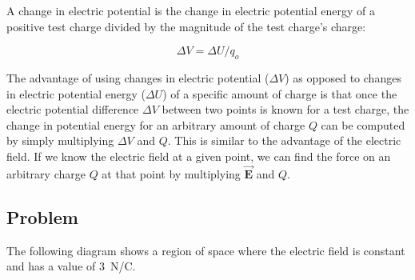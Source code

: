 \documentclass{article}
\newcommand{\bfvec}[1]{\vec{\mathbf{#1}}}
\begin{document}
A change in electric potential is the change in electric potential energy of a positive test charge divided by the magnitude of the test charge's charge:

\begin{equation}
\Delta V = {\Delta U}/{q_o}
\end{equation}

The advantage of using changes in electric potential ($\Delta V$) as opposed to changes in electric potential energy ($\Delta U$) of a specific amount of charge is that once the electric potential difference $\Delta V$ between two points is known for a test charge, the change in potential energy for an arbitrary amount of charge $Q$ can be computed by simply multiplying $\Delta V$ and $Q$. This is similar to the advantage of the electric field. If we know the electric field at a given point, we can find the force on an arbitrary charge $Q$ at that point by multiplying $\bfvec{E}$ and $Q$.

\newpage

\subsection{Problem}

The following diagram shows a region of space where the electric field is constant and has a value of $3$ N/C. 


\end{document}
